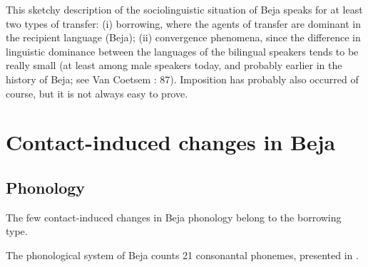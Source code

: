 \documentclass[output=paper]{langsci/langscibook}
\begin{document}
This sketchy description of the sociolinguistic situation of Beja speaks for at least two types of transfer: (i) borrowing, where the agents of transfer are dominant in the recipient language (Beja); (ii) convergence phenomena, since the difference in linguistic dominance between the languages of the bilingual speakers tends to be really small (at least among male speakers today, and probably earlier in the history of Beja; see Van Coetsem \citeyear{VanCoetsem1988}: 87). Imposition has probably also occurred of course, but it is not always easy to prove.


 \section{Contact-induced changes in Beja}


 \subsection{Phonology}


The few contact-induced changes in Beja phonology belong to the borrowing type.

The phonological system of Beja counts 21 consonantal phonemes, presented in .

\begin{table}[H]
\caption{Beja consonants}
\label{tab:vanhove:1}
\end{table}
\end{document}
